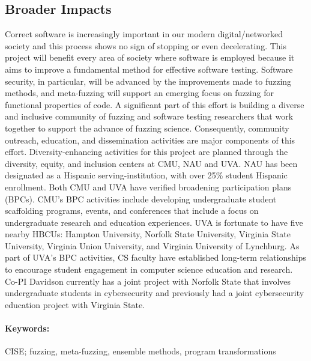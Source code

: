 \subsection*{Broader Impacts}
\vspace{-2mm}
Correct software is increasingly important in our modern digital/networked
society and this process shows no sign
of stopping or even decelerating.
This project will benefit every area of society where software is employed because it aims to improve a fundamental method for effective software testing.
Software security, in particular, will be advanced by the
improvements made to  fuzzing methods, and meta-fuzzing
will support an emerging focus on fuzzing for functional
properties of code.
A significant part of this effort is building a diverse and inclusive community of fuzzing and software testing researchers that work together to support the advance of fuzzing science.
Consequently, community outreach, education, and dissemination activities are major components of this effort.
Diversity-enhancing activities for this project are planned through
the diversity, equity, and inclusion centers at CMU, NAU and UVA.  NAU has been designated as a Hispanic serving-institution, with over 25\% student Hispanic enrollment.
Both CMU and UVA have verified broadening participation plans (BPCs).
CMU's BPC activities include developing undergraduate student scaffolding programs, events, and conferences that include a focus on undergraduate research and education experiences.
UVA is fortunate to have five nearby HBCUs: Hampton University, Norfolk State University, Virginia State University, Virginia Union University, and Virginia University of Lynchburg.
As part of UVA's BPC activities, CS faculty have established long-term relationships to encourage student engagement in computer science education and research.
Co-PI Davidson currently has a joint project with Norfolk State that involves undergraduate students in cybersecurity and previously had a joint cybersecurity education project with Virginia State.

\paragraph{Keywords:}
CISE; fuzzing, meta-fuzzing, ensemble methods, program transformations
